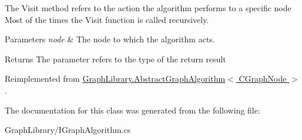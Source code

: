 The Visit method refers to the action the algorithm performs to a specific node Most of the times the Visit function is called recursively. 


\begin{DoxyParams}{Parameters}
{\em node} & The node to which the algorithm acts.\\
\hline
\end{DoxyParams}
\begin{DoxyReturn}{Returns}
The parameter refers to the type of the return result
\end{DoxyReturn}


Reimplemented from \hyperlink{class_graph_library_1_1_abstract_graph_algorithm_af0a50489383c3191e9a02cb6d8a6731d}{Graph\+Library.\+Abstract\+Graph\+Algorithm$<$ C\+Graph\+Node $>$}.



The documentation for this class was generated from the following file\+:\begin{DoxyCompactItemize}
\item 
Graph\+Library/I\+Graph\+Algorithm.\+cs\end{DoxyCompactItemize}
